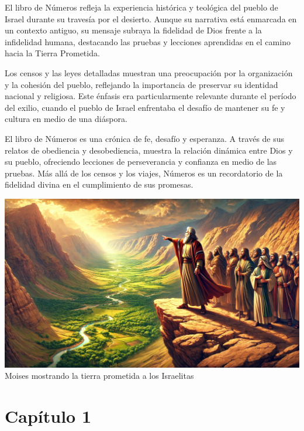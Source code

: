 El libro de Números refleja la experiencia histórica y teológica del pueblo de Israel durante su travesía por el desierto. Aunque su narrativa está enmarcada en un contexto antiguo, su mensaje subraya la fidelidad de Dios frente a la infidelidad humana, destacando las pruebas y lecciones aprendidas en el camino hacia la Tierra Prometida.

Los censos y las leyes detalladas muestran una preocupación por la organización y la cohesión del pueblo, reflejando la importancia de preservar su identidad nacional y religiosa. Este énfasis era particularmente relevante durante el período del exilio, cuando el pueblo de Israel enfrentaba el desafío de mantener su fe y cultura en medio de una diáspora.



El libro de Números es una crónica de fe, desafío y esperanza. A través de sus relatos de obediencia y desobediencia, muestra la relación dinámica entre Dios y su pueblo, ofreciendo lecciones de perseverancia y confianza en medio de las pruebas. Más allá de los censos y los viajes, Números es un recordatorio de la fidelidad divina en el cumplimiento de sus promesas.

\begin{center}
	\includegraphics[width=0.7\linewidth]{graficas/Numeros}\\
	Moises mostrando la tierra prometida a los Israelitas\\
\end{center}



\section*{Capítulo 1}

